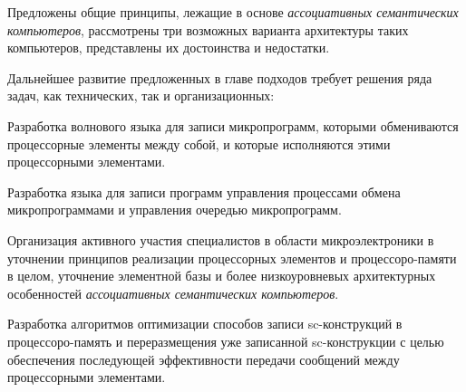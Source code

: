 Предложены общие принципы, лежащие в основе \textit{ассоциативных семантических компьютеров}, рассмотрены три возможных варианта архитектуры таких компьютеров, представлены их достоинства и недостатки.

Дальнейшее развитие предложенных в главе подходов требует решения ряда задач, как технических, так и организационных:
\begin{textitemize}
	\item Разработка волнового языка для записи микропрограмм, которыми обмениваются процессорные элементы между собой, и которые исполняются этими процессорными элементами. 
	\item Разработка языка для записи программ управления процессами обмена микропрограммами и управления очередью микропрограмм. 
	\item Организация активного участия специалистов в области микроэлектроники в уточнении принципов реализации процессорных элементов и процессоро-памяти в целом, уточнение элементной базы и более низкоуровневых архитектурных особенностей \textit{ассоциативных семантических компьютеров}.
	\item Разработка алгоритмов оптимизации способов записи sc-конструкций в процессоро-память и переразмещения уже записанной sc-конструкции с целью обеспечения последующей эффективности передачи сообщений между процессорными элементами.
\end{textitemize}
